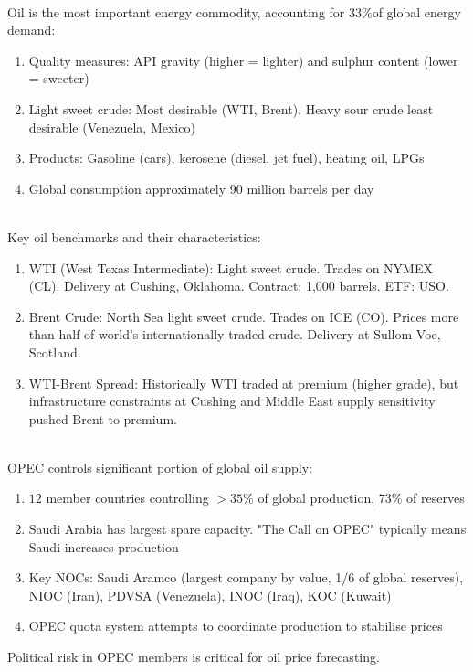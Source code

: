 \documentclass[a4paper,oneside,openany]{book}
\begin{document}
\begin{remark} \\
Oil is the most important energy commodity, accounting for $33\% $of global energy demand:
\begin{enumerate}[label=\roman*.]
\setlength{\itemsep}{0pt}
\item Quality measures: API gravity (higher = lighter) and sulphur content (lower = sweeter)
\item Light sweet crude: Most desirable (WTI, Brent). Heavy sour crude least desirable (Venezuela, Mexico)
\item Products: Gasoline (cars), kerosene (diesel, jet fuel), heating oil, LPGs
\item Global consumption approximately 90 million barrels per day
\end{enumerate}
\end{remark}

\begin{remark} \\
Key oil benchmarks and their characteristics:
\begin{enumerate}[label=\roman*.]
\setlength{\itemsep}{0pt}
\item WTI (West Texas Intermediate): Light sweet crude. Trades on NYMEX (CL). Delivery at Cushing, Oklahoma. Contract: 1,000 barrels. ETF: USO.
\item Brent Crude: North Sea light sweet crude. Trades on ICE (CO). Prices more than half of world's internationally traded crude. Delivery at Sullom Voe, Scotland.
\item WTI-Brent Spread: Historically WTI traded at premium (higher grade), but infrastructure constraints at Cushing and Middle East supply sensitivity pushed Brent to premium.
\end{enumerate}
\end{remark}

\begin{remark} \\
OPEC controls significant portion of global oil supply:
\begin{enumerate}[label=\roman*.]
\setlength{\itemsep}{0pt}
\item $12$ member countries controlling $>35\%$ of global production, $73\%$ of reserves
\item Saudi Arabia has largest spare capacity. "The Call on OPEC" typically means Saudi increases production
\item Key NOCs: Saudi Aramco (largest company by value, 1/6 of global reserves), NIOC (Iran), PDVSA (Venezuela), INOC (Iraq), KOC (Kuwait)
\item OPEC quota system attempts to coordinate production to stabilise prices
\end{enumerate}
Political risk in OPEC members is critical for oil price forecasting.
\end{remark}
\end{document}
